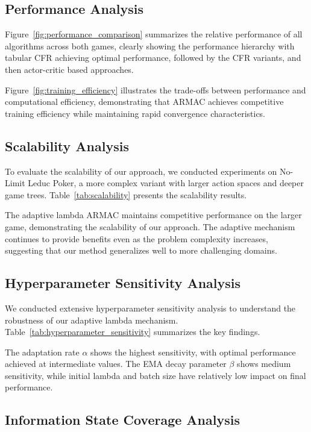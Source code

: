 \documentclass{icml2024}
\begin{document}
\subsection{Performance Analysis}

Figure~\ref{fig:performance_comparison} summarizes the relative performance of all algorithms across both games, clearly showing the performance hierarchy with tabular CFR achieving optimal performance, followed by the CFR variants, and then actor-critic based approaches.

Figure~\ref{fig:training_efficiency} illustrates the trade-offs between performance and computational efficiency, demonstrating that ARMAC achieves competitive training efficiency while maintaining rapid convergence characteristics.

\subsection{Scalability Analysis}

To evaluate the scalability of our approach, we conducted experiments on No-Limit Leduc Poker, a more complex variant with larger action spaces and deeper game trees. Table~\ref{tab:scalability} presents the scalability results.

The adaptive lambda ARMAC maintains competitive performance on the larger game, demonstrating the scalability of our approach. The adaptive mechanism continues to provide benefits even as the problem complexity increases, suggesting that our method generalizes well to more challenging domains.

\subsection{Hyperparameter Sensitivity Analysis}

We conducted extensive hyperparameter sensitivity analysis to understand the robustness of our adaptive lambda mechanism. Table~\ref{tab:hyperparameter_sensitivity} summarizes the key findings.

The adaptation rate $\alpha$ shows the highest sensitivity, with optimal performance achieved at intermediate values. The EMA decay parameter $\beta$ shows medium sensitivity, while initial lambda and batch size have relatively low impact on final performance.

\subsection{Information State Coverage Analysis}
\end{document}
